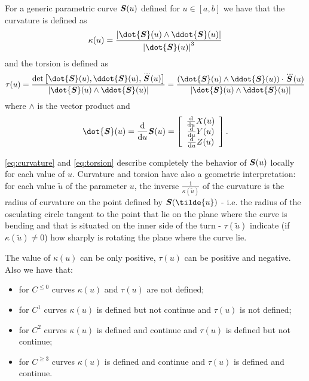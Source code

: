 \documentclass[dissertation.tex]{subfiles}
\begin{document}
For a generic parametric curve $\boldsymbol{S}(u)$ defined for $u\in[a,b]$ we
have that the curvature is defined as
\begin{equation}
  \label{eq:curvature}
  \kappa(u) = \frac{\left|\dot{\ve{S}}(u)\wedge\ddot{\ve{S}}(u)\right|}{{\left|\dot{\ve{S}}(u)\right|}^3}
\end{equation}
and the torsion is defined as
\begin{equation}
  \label{eq:torsion}
  \tau(u) =
  \frac{\det\left[\dot{\ve{S}}(u),\ddot{\ve{S}}(u),\dddot{\ve{S}}(u)\right]}{\left|\dot{\ve{S}}(u)\wedge\ddot{\ve{S}}(u)\right|}
  = \frac{\left(\dot{\ve{S}}(u)\wedge\ddot{\ve{S}}(u)\right)\cdot\dddot{\ve{S}}(u)}{\left|\dot{\ve{S}}(u)\wedge\ddot{\ve{S}}(u)\right|}
\end{equation}
where $\wedge$ is the vector product and
\begin{equation*}
  \dot{\ve{S}}(u) = \frac{\md}{\md u} \ve{S}(u)=\left[
    \begin{array}{c}
      \frac{\md}{\md u} X(u)\\
      \frac{\md}{\md u} Y(u)\\
      \frac{\md}{\md u} Z(u)
    \end{array}
    \right].
\end{equation*}

\cref{eq:curvature} and \cref{eq:torsion} describe completely the
behavior of $\boldsymbol{S}(u)$ locally for each value of $u$. Curvature and
torsion have also a geometric interpretation: for each value $\tilde{u}$ of
the parameter $u$, the inverse $\frac{1}{\kappa(\tilde{u})}$ of the
curvature is the radius of curvature on the point defined by
$\ve{S}(\tilde{u})$ - i.e. the radius of the 
osculating circle tangent to the point that lie on the plane where the
curve is bending and
that is situated on the inner side of the turn - $\tau(\tilde{u})$ indicate
(if $\kappa(\tilde{u})\neq 0$) how sharply is rotating the plane where
the curve lie.

The value of $\kappa(u)$ can be only positive, $\tau(u)$ can be
positive and negative. Also we have that:
\begin{itemize}
\item for $C^{\leq 0}$ curves $\kappa(u)$ and $\tau(u)$ are not defined;
\item for $C^1$ curves $\kappa(u)$ is defined but not continue and
  $\tau(u)$ is not defined;
\item for $C^2$ curves $\kappa(u)$ is defined and continue and
  $\tau(u)$ is defined but not continue;
\item for $C^{\geq 3}$ curves $\kappa(u)$ is defined and continue and
  $\tau(u)$ is defined and continue.
\end{itemize}
\end{document}
